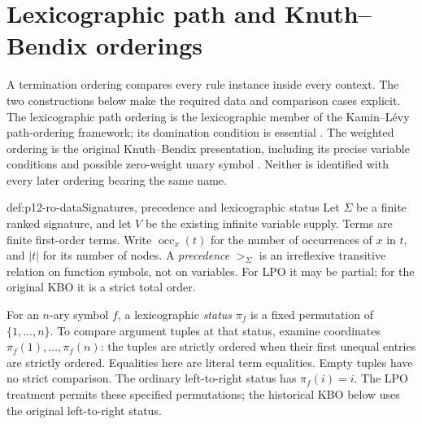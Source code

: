 \section{Lexicographic path and Knuth--Bendix orderings}
\label{sec:p12-reduction-orderings}

A termination ordering compares every rule instance inside every context.
The two constructions below make the required data and comparison cases
explicit. The lexicographic path ordering is the lexicographic member of
the Kamin--L\'evy path-ordering framework; its domination condition is
essential \cite[handwritten pp.~1--8]{KaminLevy1980Attempts}.
The weighted ordering is the original Knuth--Bendix presentation, including
its precise variable conditions and possible zero-weight unary symbol
\cite[\S\S1--2]{KnuthBendix1970}. Neither is identified with every later
ordering bearing the same name.

\begin{hbdefinition}{def:p12-ro-data}{Signatures, precedence and lexicographic status}
Let \(\Sigma\) be a finite ranked signature, and let \(V\) be the
existing infinite variable supply. Terms are finite first-order terms.
Write \(\operatorname{occ}_x(t)\) for the number of occurrences of
\(x\) in \(t\), and \(\lvert t\rvert\) for its number of nodes.
A \emph{precedence} \(>_\Sigma\) is an irreflexive transitive
relation on function symbols, not on variables. For LPO it may be partial;
for the original KBO it is a strict total order.

For an \(n\)-ary symbol \(f\), a lexicographic \emph{status}
\(\pi_f\) is a fixed permutation of \(\{1,\ldots,n\}\).
To compare argument tuples at that status, examine coordinates
\(\pi_f(1),\ldots,\pi_f(n)\): the tuples are strictly ordered
when their first unequal entries are strictly ordered. Equalities here
are literal term equalities. Empty tuples have no strict comparison.
The ordinary left-to-right status has \(\pi_f(i)=i\).
The LPO treatment permits these specified permutations; the historical
KBO below uses the original left-to-right status.
\end{hbdefinition}

